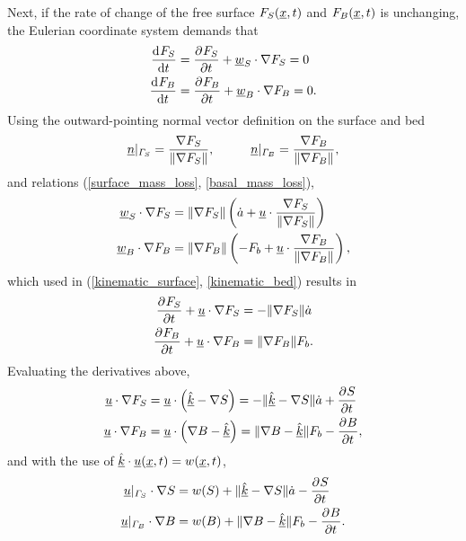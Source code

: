 Next, if the rate of change of the free surface $F_S(\underline{x},t)$ and $F_B(\underline{x},t)$ is unchanging, the Eulerian coordinate system demands that
\begin{align}
  \label{kinematic_surface}
  \frac{\mathrm{d}^{} F_S}{\mathrm{d} t^{} } &= \frac{\partial^{} F_S}{\partial t^{} } + \underline{w}_S \cdot \nabla F_S = 0 \\
  \label{kinematic_bed}
  \frac{\mathrm{d}^{} F_B}{\mathrm{d} t^{} } &= \frac{\partial^{} F_B}{\partial t^{} } + \underline{w}_B \cdot \nabla F_B = 0.
\end{align}
Using the outward-pointing normal vector definition on the surface and bed
\begin{align}
  \label{normal_vector}
  \rankone{n} |_{\Gamma_S} = \frac{\nabla F_S}{\Vert \nabla F_S \Vert}, \hspace{10mm}
  \rankone{n} |_{\Gamma_B} = \frac{\nabla F_B}{\Vert \nabla F_B \Vert},
\end{align}
and relations (\ref{surface_mass_loss}, \ref{basal_mass_loss}),
\begin{align*}
  \underline{w}_S \cdot \nabla F_S &= \Vert \nabla F_S \Vert \left( \dot{a} + \underline{u} \cdot \frac{\nabla F_S}{\Vert \nabla F_S \Vert} \right) \\
  \underline{w}_B \cdot \nabla F_B &= \Vert \nabla F_B \Vert \left( - F_b + \underline{u} \cdot \frac{\nabla F_B}{\Vert \nabla F_B \Vert} \right),
\end{align*}
which used in (\ref{kinematic_surface}, \ref{kinematic_bed}) results in  
\begin{align*}
  \frac{\partial^{} F_S}{\partial t^{} } + \underline{u} \cdot \nabla F_S &= - \Vert \nabla F_S \Vert \dot{a} \\
  \frac{\partial^{} F_B}{\partial t^{} } + \underline{u} \cdot \nabla F_B &= \Vert \nabla F_B \Vert F_b.
\end{align*}
Evaluating the derivatives above,
\begin{align*}
  \underline{u} \cdot \nabla F_S &= \underline{u} \cdot \left( \hat{\underline{k}} - \nabla S \right) = - \Vert \hat{\underline{k}} - \nabla S \Vert \dot{a} + \frac{\partial^{} S}{\partial t^{} } \\
  \underline{u} \cdot \nabla F_B &= \underline{u} \cdot \left( \nabla B - \hat{\underline{k}} \right) = \Vert \nabla B - \hat{\underline{k}} \Vert F_b - \frac{\partial^{} B}{\partial t^{} },
\end{align*}
and with the use of $\hat{\underline{k}} \cdot \underline{u}(\underline{x},t) = w(\underline{x},t)$, 
\begin{align}
  \label{u_dot_gradS}
  \underline{u} |_{\varGamma_S} \cdot \nabla S &= w(S) + \Vert \hat{\underline{k}} - \nabla S \Vert \dot{a} - \frac{\partial^{} S}{\partial t^{} } \\
  \label{u_dot_gradB}
  \underline{u} |_{\varGamma_B} \cdot \nabla B &= w(B) + \Vert \nabla B - \hat{\underline{k}} \Vert F_b - \frac{\partial^{} B}{\partial t^{} }.
\end{align}

